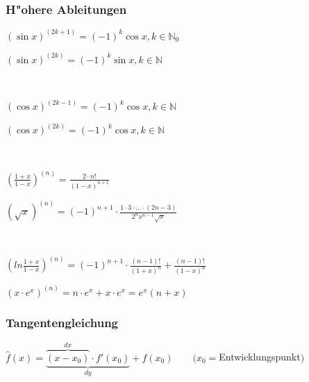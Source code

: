\subsubsection{H"ohere Ableitungen }
	\begin{minipage}[t]{9.5cm} 
		$ (\sin x)^{(2k+1)} = (-1)^k \cos x, k \in \mathbb{N}_0 $ 
	\end{minipage} 
	\begin{minipage}[t]{9.5cm} 
		$ (\sin x)^{(2k)} = (-1)^k \sin x, k \in \mathbb{N} $
	\end{minipage} \\
	\begin{minipage}[t]{9.5cm} 
		$ (\cos x)^{(2k-1)} = (-1)^k \cos x, k \in \mathbb{N} $ 
	\end{minipage} 
	\begin{minipage}[t]{9.5cm} 
		$ (\cos x)^{(2k)} = (-1)^k \cos x, k \in \mathbb{N} $
	\end{minipage} \\
	\begin{minipage}[t]{9.5cm} 
		$ \left(\frac{1+x}{1-x}\right)^{(n)} = \frac{2 \cdot n!}{(1-x)^{n+1}} $
	\end{minipage} 
	\begin{minipage}[t]{9.5cm} 
		$ (\sqrt{x})^{(n)} = (-1)^{n+1} \cdot \frac{1 \cdot 3 \cdot ... \cdot (2n-3)}{2^n x^{n-1} \sqrt{x}} $
	\end{minipage}  \\
	\begin{minipage}[t]{9.5cm} 
		$ \left(ln\frac{1+x}{1-x}\right)^{(n)} = (-1)^{n+1} \cdot \frac{(n-1)!}{(1+x)^n} + \frac{(n-1)!}{(1-x)^n}$
	\end{minipage} 
	\begin{minipage}[t]{9.5cm} 
		$ (x \cdot e^{x})^{(n)} = n \cdot e^x + x \cdot e^x = e^x (n + x)$
	\end{minipage} 
	
\subsubsection{Tangentengleichung}
	$\hat{f}(x) = \underbrace{\overbrace{(x - x_0)}^{dx} \cdot f'(x_0)}_{dy} + f(x_0) \qquad (x_0 = $Entwicklungspunkt$)$ 

